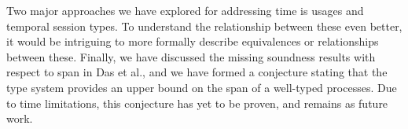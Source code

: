 Two major approaches we have explored for addressing time is usages and temporal session types. To understand the relationship between these even better, it would be intriguing to more formally describe equivalences or relationships between these. Finally, we have discussed the missing soundness results with respect to span in Das et al., and we have formed a conjecture stating that the type system provides an upper bound on the span of a well-typed processes. Due to time limitations, this conjecture has yet to be proven, and remains as future work.